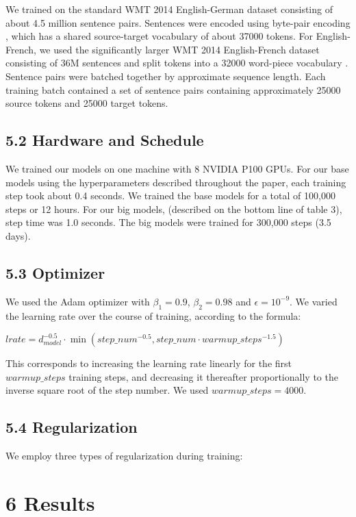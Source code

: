 \documentclass[conference]{IEEEtran}
\begin{document}
We trained on the standard WMT 2014 English-German dataset consisting of about 4.5 million sentence pairs. Sentences were encoded using byte-pair encoding \cite{ref3}, which has a shared source-target vocabulary of about 37000 tokens. For English-French, we used the significantly larger WMT 2014 English-French dataset consisting of 36M sentences and split tokens into a 32000 word-piece vocabulary \cite{ref38}. Sentence pairs were batched together by approximate sequence length. Each training batch contained a set of sentence pairs containing approximately 25000 source tokens and 25000 target tokens.

\subsection{5.2 Hardware and Schedule}

We trained our models on one machine with 8 NVIDIA P100 GPUs. For our base models using the hyperparameters described throughout the paper, each training step took about 0.4 seconds. We trained the base models for a total of 100,000 steps or 12 hours. For our big models, (described on the bottom line of table 3), step time was 1.0 seconds. The big models were trained for 300,000 steps (3.5 days).

\subsection{5.3 Optimizer}

We used the Adam optimizer \cite{ref20} with $\beta_1 = 0.9$, $\beta_2 = 0.98$ and $\epsilon = 10^{-9}$. We varied the learning rate over the course of training, according to the formula:

$lrate = d_{model}^{-0.5} \cdot \min(step\_num^{-0.5}, step\_num \cdot warmup\_steps^{-1.5})$ 

This corresponds to increasing the learning rate linearly for the first $warmup\_steps$ training steps, and decreasing it thereafter proportionally to the inverse square root of the step number. We used $warmup\_steps = 4000$.

\subsection{5.4 Regularization}

We employ three types of regularization during training:

\section{6 Results}
\end{document}
